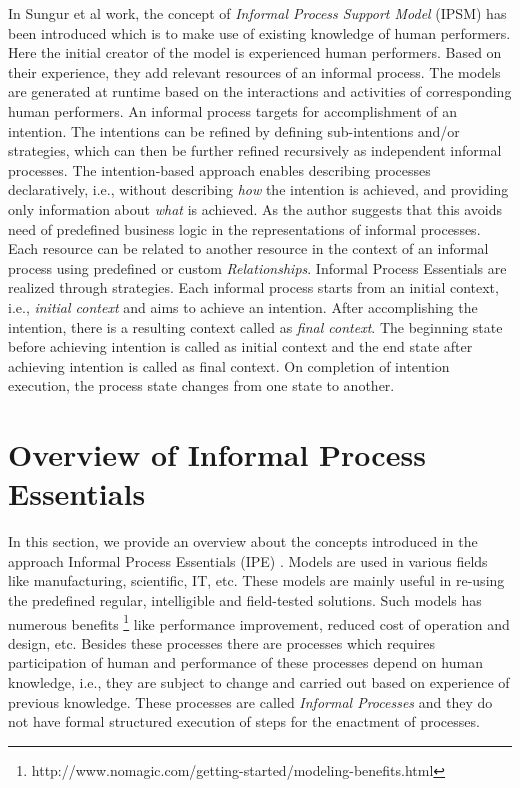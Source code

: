 In Sungur et al \cite{Sungur2014a} work, the concept of \textit{Informal Process Support Model} (IPSM) has been introduced which is to make use of existing knowledge of human performers. Here the initial creator of the model is experienced human performers. Based on their experience, they add relevant  resources of an informal process. The models are generated at runtime based on the interactions and activities of corresponding human performers. An informal process targets for accomplishment of an intention. The intentions can be refined by defining sub-intentions and/or strategies, which can then be further refined recursively as independent informal processes. The intention-based approach enables describing processes declaratively, i.e., without describing \textit{how} the intention is achieved, and providing only information about \textit{what} is achieved. As the author \cite{Sungur2014a} suggests that this avoids need of predefined business logic in the representations of informal processes. Each resource can be related to another resource in the context of an informal process using predefined or custom \textit{Relationships}. Informal Process Essentials are realized through strategies. Each informal process starts from an initial context, i.e., \textit{initial context} and aims to achieve an intention. After accomplishing the intention, there is a resulting context called as \textit{final context}. The beginning state before achieving intention is called as initial context and the end state after achieving intention is called as final context. On completion of intention execution, the process state changes from one state to another.

\section{Overview of Informal Process Essentials}
\label{sec:basicconcepts}
In this section, we provide an overview about the concepts introduced in the approach Informal Process Essentials (IPE) \cite{Sungur2014a}. Models are used in various fields like manufacturing, scientific, IT, etc. These models are mainly useful in re-using the predefined regular, intelligible and field-tested solutions. Such models has numerous benefits \footnote{http://www.nomagic.com/getting-started/modeling-benefits.html} like performance improvement, reduced cost of operation and design, etc. Besides these processes there are processes which requires participation of human and performance of these processes depend on human knowledge, i.e., they are subject to change and carried out based on experience of previous knowledge. These processes are called \textit{Informal Processes} and they do not have formal structured execution of steps for the enactment of processes. 

